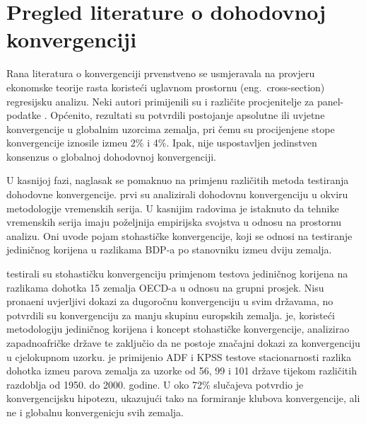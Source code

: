 \documentclass{crebsshr}
\begin{document}
\section{Pregled literature o dohodovnoj konvergenciji}
Rana literatura o konvergenciji prvenstveno se usmjeravala na provjeru ekonomske teorije rasta \citep{barro-salaimartin:90, barro:92, mankiw:92} koriste\'ci uglavnom prostornu (eng.\ cross-section) regresijsku analizu. Neki autori primijenili su i razli\v{c}ite procjenitelje za panel-podatke \citep{knight:93, islam:95, caselli:96, lee:98, bond:01}. Općenito, rezultati su potvrdili postojanje apsolutne ili uvjetne konvergencije u globalnim uzorcima zemalja, pri \v{c}emu su procijenjene stope konvergencije iznosile izme\dj{}u 2\% i 4\%. Ipak, nije uspostavljen jedinstven konsenzus o globalnoj dohodovnoj konvergenciji.

U kasnijoj fazi, naglasak se pomaknuo na primjenu razli\v{c}itih metoda testiranja dohodovne konvergencije. \cite{bernard-durlauf:91} prvi su analizirali dohodovnu konvergenciju u okviru metodologije vremenskih serija. U kasnijim radovima \citep{bernard-durlauf:96} je istaknuto da tehnike vremenskih serija imaju po\v{z}eljnija empirijska svojstva u odnosu na prostornu analizu. Oni uvode pojam stohasti\v{c}ke konvergencije, koji se odnosi na testiranje jedini\v{c}nog korijena u razlikama BDP-a po stanovniku izme\dj{}u dviju zemalja.

\cite{bernard-durlauf:96} testirali su stohasti\v{c}ku konvergenciju primjenom testova jedini\v{c}nog korijena na razlikama dohotka 15 zemalja OECD-a u odnosu na grupni prosjek. Nisu prona\dj{}eni uvjerljivi dokazi za dugoro\v{c}nu konvergenciju u svim dr\v{z}avama, no potvrdili su konvergenciju za manju skupinu europskih zemalja. \cite{jones:02} je, koriste\'ci metodologiju jedini\v{c}nog korijena i koncept stohasti\v{c}ke konvergencije, analizirao zapadnoafri\v{c}ke dr\v{z}ave te zaklju\v{c}io da ne postoje zna\v{c}ajni dokazi za konvergenciju u cjelokupnom uzorku. \cite{pesaran:06} je primijenio  ADF i KPSS testove stacionarnosti razlika dohotka izme\dj{}u parova zemalja za uzorke od 56, 99 i 101 dr\v{z}ave tijekom razli\v{c}itih razdoblja od 1950. do 2000. godine. U oko 72\% slu\v{c}ajeva potvrdio je konvergencijsku hipotezu, ukazuju\'ci tako na formiranje klubova konvergencije, ali ne i globalnu konvergenicju svih zemalja.
\end{document}
